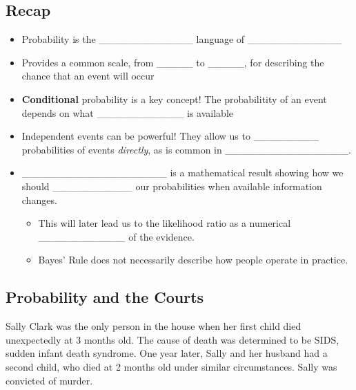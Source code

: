 \documentclass[]{book}
\providecommand{\tightlist}{%
  \setlength{\itemsep}{0pt}\setlength{\parskip}{0pt}}
\theoremstyle{definition}
\theoremstyle{definition}
\theoremstyle{remark}
\begin{document}
\subsection{Recap}\label{recap}

\begin{itemize}
\tightlist
\item
  Probability is the \_\_\_\_\_\_\_\_\_\_\_\_\_ language of
  \_\_\_\_\_\_\_\_\_\_\_\_\_ \vspace{.1in}
\item
  Provides a common scale, from \_\_\_\_\_ to \_\_\_\_\_, for describing
  the chance that an event will occur \vspace{.1in}
\item
  \textbf{Conditional} probability is a key concept! The probabilitity
  of an event depends on what \_\_\_\_\_\_\_\_\_\_\_\_ is available
  \vspace{.1in}
\item
  Independent events can be powerful! They allow us to
  \_\_\_\_\_\_\_\_\_ probabilities of events \emph{directly}, as is
  common in \_\_\_\_\_\_\_\_\_\_\_\_\_\_\_\_\_. \vspace{.1in}
\item
  \_\_\_\_\_\_\_\_\_\_\_\_\_\_\_\_\_\_\_\_ is a mathematical result
  showing how we should \_\_\_\_\_\_\_\_\_\_\_ our probabilities when
  available information changes. \vspace{.1in}

  \begin{itemize}
  \tightlist
  \item
    This will later lead us to the likelihood ratio as a numerical
    \_\_\_\_\_\_\_\_\_\_\_\_ of the evidence. \vspace{.1in}
  \item
    Bayes' Rule does not necessarily describe how people operate in
    practice.
  \end{itemize}
\end{itemize}

\subsection{Probability and the
Courts}\label{probability-and-the-courts}

Sally Clark was the only person in the house when her first child died
unexpectedly at 3 months old. The cause of death was determined to be
SIDS, sudden infant death syndrome. One year later, Sally and her
husband had a second child, who died at 2 months old under similar
circumstances. Sally was convicted of murder.
\end{document}
